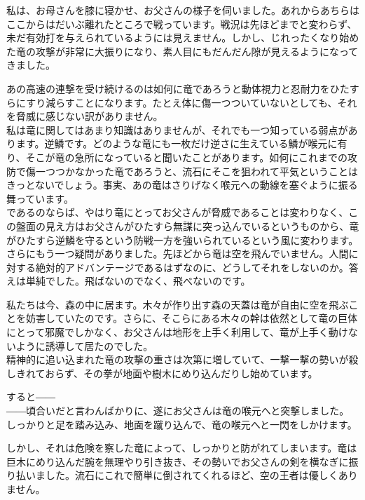 \documentclass[oneside, a4paper]{jsbook}
\begin{document}
私は、お母さんを膝に寝かせ、お父さんの様子を伺いました。あれからあちらはここからはだいぶ離れたところで戦っています。戦況は先ほどまでと変わらず、未だ有効打を与えられているようには見えません。しかし、じれったくなり始めた竜の攻撃が非常に大振りになり、素人目にもだんだん隙が見えるようになってきました。

あの高速の連撃を受け続けるのは如何に竜であろうと動体視力と忍耐力をひたすらにすり減らすことになります。たとえ体に傷一つついていないとしても、それを脅威に感じない訳がありません。\\

私は竜に関してはあまり知識はありませんが、それでも一つ知っている弱点があります。逆鱗です。どのような竜にも一枚だけ逆さに生えている鱗が喉元に有り、そこが竜の急所になっていると聞いたことがあります。如何にこれまでの攻防で傷一つつかなかった竜であろうと、流石にそこを狙われて平気ということはきっとないでしょう。事実、あの竜はさりげなく喉元への動線を塞ぐように振る舞っています。\\

であるのならば、やはり竜にとってお父さんが脅威であることは変わりなく、この盤面の見え方はお父さんがひたすら無謀に突っ込んでいるというものから、竜がひたすら逆鱗を守るという防戦一方を強いられているという風に変わります。\\

さらにもう一つ疑問がありました。先ほどから竜は空を飛んでいません。人間に対する絶対的アドバンテージであるはずなのに、どうしてそれをしないのか。答えは単純でした。飛ばないのでなく、飛べないのです。

私たちは今、森の中に居ます。木々が作り出す森の天蓋は竜が自由に空を飛ぶことを妨害していたのです。さらに、そこらにある木々の幹は依然として竜の巨体にとって邪魔でしかなく、お父さんは地形を上手く利用して、竜が上手く動けないように誘導して居たのでした。\\

精神的に追い込まれた竜の攻撃の重さは次第に増していて、一撃一撃の勢いが殺しきれておらず、その拳が地面や樹木にめり込んだりし始めています。

すると――\\

――頃合いだと言わんばかりに、遂にお父さんは竜の喉元へと突撃しました。\\

しっかりと足を踏み込み、地面を蹴り込んで、竜の喉元へと一閃をしかけます。

しかし、それは危険を察した竜によって、しっかりと防がれてしまいます。竜は巨木にめり込んだ腕を無理やり引き抜き、その勢いでお父さんの剣を横なぎに振り払いました。流石にこれで簡単に倒されてくれるほど、空の王者は優しくありません。\\
\end{document}
